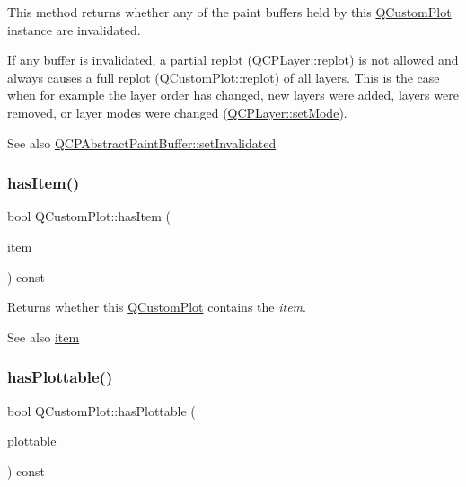 This method returns whether any of the paint buffers held by this \mbox{\hyperlink{class_q_custom_plot}{Q\+Custom\+Plot}} instance are invalidated.

If any buffer is invalidated, a partial replot (\mbox{\hyperlink{class_q_c_p_layer_adefd53b6db02f470151c416f42e37180}{Q\+C\+P\+Layer\+::replot}}) is not allowed and always causes a full replot (\mbox{\hyperlink{class_q_custom_plot_aa4bfe7d70dbe67e81d877819b75ab9af}{Q\+Custom\+Plot\+::replot}}) of all layers. This is the case when for example the layer order has changed, new layers were added, layers were removed, or layer modes were changed (\mbox{\hyperlink{class_q_c_p_layer_a938d57b04f4e4c23cedf1711f983919b}{Q\+C\+P\+Layer\+::set\+Mode}}).

\begin{DoxySeeAlso}{See also}
\mbox{\hyperlink{class_q_c_p_abstract_paint_buffer_ae4c7dc70dfc66be2879ce297b2b3d67f}{Q\+C\+P\+Abstract\+Paint\+Buffer\+::set\+Invalidated}} 
\end{DoxySeeAlso}
\mbox{\label{class_q_custom_plot_af0b57f35646079f93fa6161a65b36109}} 
\subsubsection{\texorpdfstring{has\+Item()}{hasItem()}}
{\footnotesize\ttfamily bool Q\+Custom\+Plot\+::has\+Item (\begin{DoxyParamCaption}\item[{\mbox{\hyperlink{class_q_c_p_abstract_item}{Q\+C\+P\+Abstract\+Item}} $\ast$}]{item }\end{DoxyParamCaption}) const}

Returns whether this \mbox{\hyperlink{class_q_custom_plot}{Q\+Custom\+Plot}} contains the {\itshape item}.

\begin{DoxySeeAlso}{See also}
\mbox{\hyperlink{class_q_custom_plot_ac042f2e78edd228ccf2f26b7fe215239}{item}} 
\end{DoxySeeAlso}
\mbox{\label{class_q_custom_plot_a72cefbfbb9e699940e37be605bd9c51e}} 
\subsubsection{\texorpdfstring{has\+Plottable()}{hasPlottable()}}
{\footnotesize\ttfamily bool Q\+Custom\+Plot\+::has\+Plottable (\begin{DoxyParamCaption}\item[{\mbox{\hyperlink{class_q_c_p_abstract_plottable}{Q\+C\+P\+Abstract\+Plottable}} $\ast$}]{plottable }\end{DoxyParamCaption}) const}

